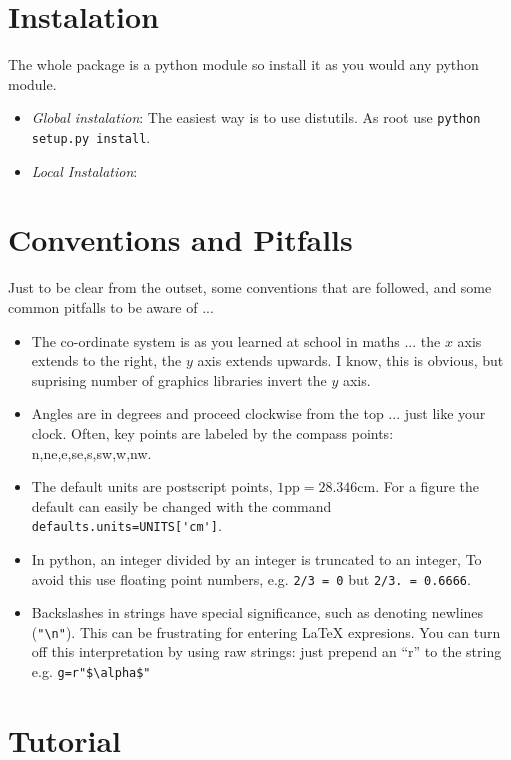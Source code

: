 \documentclass[a4paper]{book}
\begin{document}
\section{Instalation}
\label{sec:instalation}

The whole package is a python module so install it as you would any
python module.

\begin{itemize}
\item \emph{Global instalation}: The easiest way is to use distutils.
  As root use \Verb|python setup.py install|.
\item \emph{Local Instalation}:
\end{itemize}

\section{Conventions and Pitfalls}
\label{sec:conventions}

Just to be clear from the outset, some conventions that are followed, and 
some common pitfalls to be aware of ...

\begin{itemize}
\item The co-ordinate system is as you learned at school in maths ...
  the $x$ axis extends to the right, the $y$ axis extends upwards. I know, this is
  obvious, but suprising number of graphics libraries invert the $y$ axis.
\item Angles are in degrees and proceed clockwise from the top ...
  just like your clock. Often, key points are labeled by the compass
  points: n,ne,e,se,s,sw,w,nw.
\item The default units are postscript points,
  $1\mathrm{pp}=28.346\mathrm{cm}$. For a figure the default can
  easily be changed with the command
  \Verb|defaults.units=UNITS['cm']|.
\item In python, an integer divided by an integer is truncated to an
  integer, To avoid this use floating point numbers, e.g. \Verb|2/3 = 0|
  but \Verb|2/3. = 0.6666|.
\item Backslashes in strings have special significance, such as
  denoting newlines (\Verb|"\n"|). This can be frustrating for
  entering \LaTeX{} expresions. You can turn off this interpretation by
  using raw strings: just prepend an ``r'' to the string e.g.
  \Verb|g=r"$\alpha$"|
\end{itemize}


\section{Tutorial}
\label{sec:tutotial}
\end{document}
